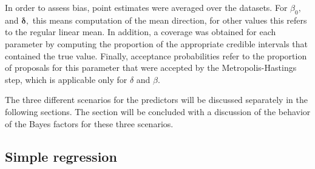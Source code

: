 \documentclass[11pt,a4paper]{article}\usepackage[]{graphicx}\usepackage[]{color}
\newcommand{\bdt}{\boldsymbol{\delta}}
\begin{document}
In order to assess bias,  point estimates were  averaged over the datasets. For \( \beta_0,\) and \( \bdt, \) this means computation of the mean direction, for other values this refers to the regular linear mean. In addition, a coverage was obtained for each parameter by computing the proportion of the appropriate credible intervals that contained the true value. Finally, acceptance probabilities refer to the proportion of proposals for this parameter that were accepted by the Metropolis-Hastings step, which is applicable only for \( \delta \) and \( \beta \).

The three different scenarios for the predictors will be discussed separately in the following sections.  The section will be concluded with a discussion of the behavior of the Bayes factors for these three scenarios.

\subsection{Simple regression}

\label{SimpleRegression}
\end{document}
